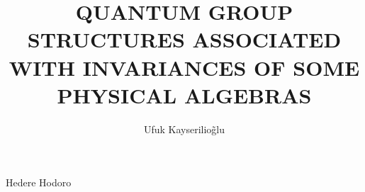 \documentclass[pdf,colorBG,slideColor,fyma]{prosper}
\title{QUANTUM GROUP STRUCTURES ASSOCIATED WITH INVARIANCES OF SOME PHYSICAL ALGEBRAS}
\author{Ufuk Kayserilio\~ glu}
\begin{document}
\maketitle

\begin{slide}[Dissolve]{}
Hedere Hodoro
\end{slide}


\begin{slide}{}
\end{slide}


\begin{slide}{}
\end{slide}


\begin{slide}{}
\end{slide}
\end{document}
